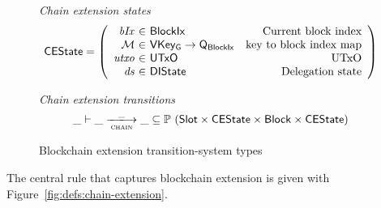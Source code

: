 \documentclass[11pt,a4paper]{article}
\newcommand{\powerset}[1]{\mathbb{P}~#1}
\newcommand{\var}[1]{\mathit{#1}}
\newcommand{\type}[1]{\mathsf{#1}}
\newcommand{\trans}[2]{\xlongrightarrow[\textsc{#1}]{#2}}
\newcommand{\Slot}{\type{Slot}}
\newcommand{\BlockIx}{\type{BlockIx}}
\newcommand{\Block}{\type{Block}}
\newcommand{\Queue}{\type{Q}}
\newcommand{\VKeyGen}{\type{VKey_G}}
\newcommand{\signmapname}{\mathcal{M}}
\newcommand{\totalf}{\to}
\begin{document}
\begin{figure}[ht]
  \emph{Chain extension states}
  \begin{equation*}
    \CEState =
    \left(
      \begin{array}{r@{~\in~}lr}
        \var{bIx} & \BlockIx & \text{Current block index} \\
        \signmapname & \VKeyGen \totalf \Queue_\BlockIx & \text{key to block index map} \\
        \var{utxo} & \UTxO & \text{UTxO} \\
        \var{ds} & \DIState & \text{Delegation state}
      \end{array}
    \right)
  \end{equation*}

  \emph{Chain extension transitions}
  \begin{equation*}
    \_ \vdash \var{\_} \trans{chain}{\_} \var{\_} \subseteq
    \powerset (\Slot \times \CEState \times \Block \times \CEState)
  \end{equation*}

  \caption{Blockchain extension transition-system types}
  \label{fig:ts-types:chain-extension}
\end{figure}

The central rule that captures blockchain extension is given with
Figure~\ref{fig:defs:chain-extension}.
\end{document}
